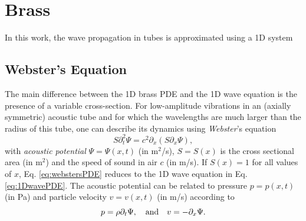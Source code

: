 \chapter{Brass}\label{ch:brass}


In this work, the wave propagation in tubes is approximated using a 1D system

\section{Webster's Equation}

The main difference between the 1D brass PDE and the 1D wave equation is the presence of a variable cross-section. For low-amplitude vibrations in an (axially symmetric) acoustic tube and for which the wavelengths are much larger than the radius of this tube, one can describe its dynamics using \textit{Webster}'s equation \cite{Webster1919}
\begin{equation}\label{eq:webstersPDE}
    S\partial_t^2\Psi = c^2\partial_x(S\partial_x\Psi),
\end{equation}
with \textit{acoustic potential} $\Psi = \Psi(x,t)$ (in m$^2$/s), $S = S(x)$ is the cross sectional area (in m$^2$) and the speed of sound in air $c$ (in m/s). If $S(x) = 1$ for all values of $x$, Eq. \eqref{eq:webstersPDE} reduces to the 1D wave equation in Eq. \eqref{eq:1DwavePDE}. The acoustic potential can be related to pressure $p = p(x,t)$ (in Pa) and particle velocity $v = v(x,t)$ (in m/s) according to
\begin{equation}
    p = \rho \partial_t \Psi, \quad \text{and} \quad v = -\partial_x \Psi.
\end{equation}



